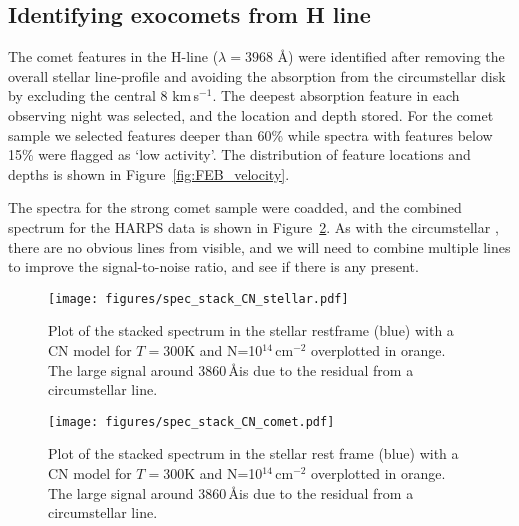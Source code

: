\documentclass{aa}
\begin{document}
\subsection{Identifying exocomets from \texorpdfstring{}{CaII} H line}\label{sect:FEBid}
The comet features in the  H-line ($\lambda=3968$ \AA) were identified after removing the overall stellar line-profile and avoiding the absorption from the circumstellar disk by excluding the central 8 km\,s$^{-1}$.
%
The deepest absorption feature in each observing night was selected, and the location and depth stored.
%
For the comet sample we selected features deeper than 60\% %
while spectra with features below 15\% %
were flagged as `low activity'.
%
The distribution of feature locations and depths is shown in Figure~\ref{fig:FEB_velocity}.

The spectra for the strong comet sample were coadded, and the combined spectrum for the HARPS data is shown in Figure~\ref{fig:spec_CN_comet_frame}.
%
As with the circumstellar , there are no obvious lines from  visible, and we will need to combine multiple lines to improve the signal-to-noise ratio, and see if there is any  present. 


\begin{figure}
    \begin{centering}
        \texttt{[image: figures/spec\_stack\_CN\_stellar.pdf]}
        \caption{Plot of the stacked spectrum in the stellar restframe (blue) with a CN model for $T=$300K and N=10$^{14}$\,cm$^{-2}$ overplotted in orange. The large signal around 3860\,\AA is due to the residual from a circumstellar  line.}
        \label{fig:spec_CN_stellar_frame}
    \end{centering}
\end{figure}


\begin{figure}
    \begin{centering}
        \texttt{[image: figures/spec\_stack\_CN\_comet.pdf]}
        \caption{Plot of the stacked spectrum in the stellar rest frame (blue) with a CN model for $T=$300K and N=10$^{14}$\,cm$^{-2}$ overplotted in orange. The large signal around 3860\,\AA is due to the residual from a circumstellar  line.}
        \label{fig:spec_CN_comet_frame}
    \end{centering}
\end{figure}
\end{document}
